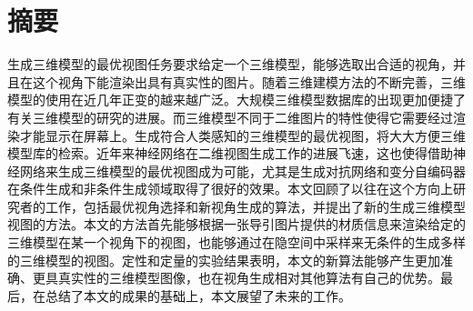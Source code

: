 \documentclass[UTF8,openany,AutoFakeBold,AutoFakeSlant,cs4size]{ctexbook}
\title{}
\author{}
\date{}
\begin{document}
\newcommand{\chineseTitle}{三维模型最优二维视图生成方法研究}
\newcommand{\englishTitle}{Synthesizing best 2D views of 3D models}
\newcommand{\name}{黄道吉}
\newcommand{\studentID}{1600017857}
\newcommand{\school}{元培学院}
\newcommand{\major}{计算机科学与技术}
\newcommand{\advisor}{连宙辉}

\clearpage




\quad
\setcounter{page}{0}
\thispagestyle{empty}
\clearpage



\pagestyle{fancy}
\normalsize
\linespread{1.5}\selectfont
\chapter*{摘要}

生成三维模型的最优视图任务要求给定一个三维模型，能够选取出合适的视角，并且在这个视角下能渲染出具有真实性的图片。随着三维建模方法的不断完善，三维模型的使用在近几年正变的越来越广泛。大规模三维模型数据库的出现更加便捷了有关三维模型的研究的进展。而三维模型不同于二维图片的特性使得它需要经过渲染才能显示在屏幕上。生成符合人类感知的三维模型的最优视图，将大大方便三维模型库的检索。近年来神经网络在二维视图生成工作的进展飞速，这也使得借助神经网络来生成三维模型的最优视图成为可能，尤其是生成对抗网络和变分自编码器在条件生成和非条件生成领域取得了很好的效果。本文回顾了以往在这个方向上研究者的工作，包括最优视角选择和新视角生成的算法，并提出了新的生成三维模型视图的方法。本文的方法首先能够根据一张导引图片提供的材质信息来渲染给定的三维模型在某一个视角下的视图，也能够通过在隐空间中采样来无条件的生成多样的三维模型的视图。定性和定量的实验结果表明，本文的新算法能够产生更加准确、更具真实性的三维模型图像，也在视角生成相对其他算法有自己的优势。最后，在总结了本文的成果的基础上，本文展望了未来的工作。

\bigskip
{}



{
	\fancyhf{} %



	\fancyfoot[CO,CE]{~\thepage~}

	\renewcommand{\headrulewidth}{0.7pt} %

	\renewcommand{\footrulewidth}{0pt} %
}
\end{document}
